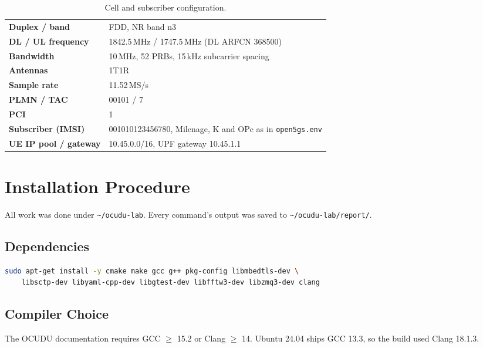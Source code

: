 \documentclass[11pt,a4paper]{article}
\newcommand{\fpath}[1]{\texttt{#1}}
\begin{document}
\begin{table}[H]
\centering
\begin{tabularx}{0.9\textwidth}{>{\bfseries}l X}
\toprule
Duplex / band        & FDD, NR band n3 \\
DL / UL frequency    & 1842.5\,MHz / 1747.5\,MHz (DL ARFCN 368500) \\
Bandwidth            & 10\,MHz, 52 PRBs, 15\,kHz subcarrier spacing \\
Antennas             & 1T1R \\
Sample rate          & 11.52\,MS/s \\
PLMN / TAC           & 00101 / 7 \\
PCI                  & 1 \\
Subscriber (IMSI)    & 001010123456780, Milenage, K and OPc as in \texttt{open5gs.env} \\
UE IP pool / gateway & 10.45.0.0/16, UPF gateway 10.45.1.1 \\
\bottomrule
\end{tabularx}
\caption{Cell and subscriber configuration.}
\end{table}

\section{Installation Procedure}

All work was done under \fpath{\textasciitilde/ocudu-lab}. Every command's output was saved
to \fpath{\textasciitilde/ocudu-lab/report/}.

\subsection{Dependencies}

\begin{lstlisting}[language=bash]
sudo apt-get install -y cmake make gcc g++ pkg-config libmbedtls-dev \
    libsctp-dev libyaml-cpp-dev libgtest-dev libfftw3-dev libzmq3-dev clang
\end{lstlisting}

\subsection{Compiler Choice}
\label{sec:compiler}

The OCUDU documentation requires GCC $\geq$ 15.2 or Clang $\geq$ 14. Ubuntu
24.04 ships GCC 13.3, so the build used Clang 18.1.3.
\end{document}
